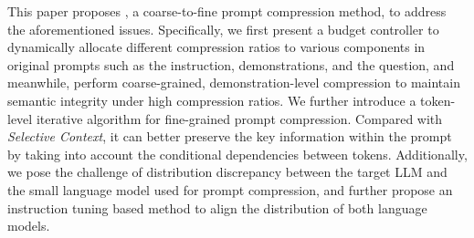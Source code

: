 
This paper proposes \textit{\sysname{}},
a coarse-to-fine prompt compression method, to address the aforementioned issues.
Specifically, we first present a budget controller to dynamically allocate different compression ratios to various components in original prompts such as the instruction, demonstrations, and the question, and meanwhile, perform coarse-grained, demonstration-level compression to maintain semantic integrity under high compression ratios.
We further introduce a token-level iterative  algorithm for fine-grained prompt compression.
Compared with \textit{Selective Context}, it can better preserve the key information within the prompt by taking into account the conditional dependencies between tokens.
Additionally, we pose the challenge of distribution discrepancy between the target LLM and the small language model used for prompt compression, and further propose an instruction tuning based method to align the distribution of both language models.

